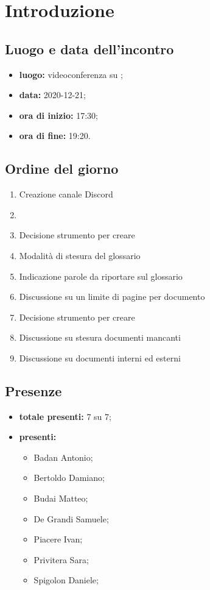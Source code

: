 \section*{Introduzione}

\subsection*{Luogo e data dell'incontro}
\begin{itemize}
	\item \textbf{luogo:} videoconferenza su ;
	\item \textbf{data:} 2020-12-21;
	\item \textbf{ora di inizio:} 17:30;
	\item \textbf{ora di fine:} 19:20.
\end{itemize}

\subsection*{Ordine del giorno}
	\begin{enumerate}
	\item Creazione canale Discord
	\item {}
	\item Decisione strumento per creare 
	\item Modalità di stesura del glossario
	\item Indicazione parole da riportare sul glossario
	\item Discussione su un limite di pagine per documento
	\item Decisione strumento per creare 
	\item Discussione su stesura documenti mancanti
	\item Discussione su documenti interni ed esterni
\end{enumerate}

\subsection*{Presenze}
\begin{itemize}
	\item \textbf{totale presenti:} 7 su 7;
	\item \textbf{presenti: }
	\begin{itemize}
		\item Badan Antonio;
		\item Bertoldo Damiano;
		\item Budai Matteo;
		\item De Grandi Samuele;
		\item Piacere Ivan;
		\item Privitera Sara;
		\item Spigolon Daniele;
	\end{itemize}
\end{itemize}

